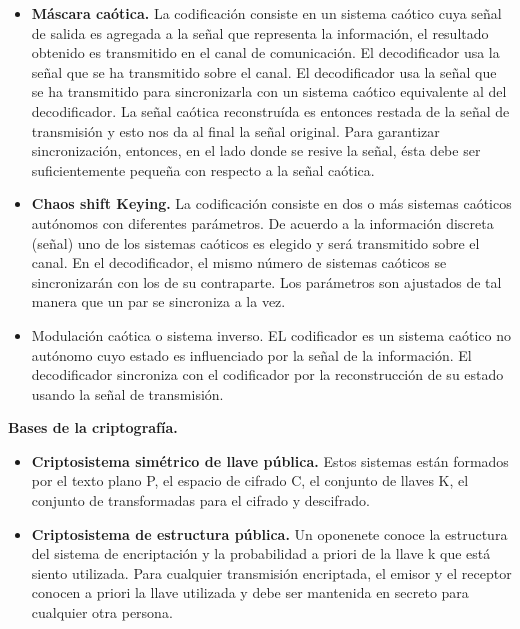 \documentclass[10pt]{IEEEtran}
\begin{document}
\begin{itemize}
\item \textbf{Máscara caótica.} La codificación consiste en un sistema caótico cuya señal de salida es agregada a la señal que representa la información, el resultado obtenido es transmitido en el canal de comunicación. El decodificador usa la señal que se ha transmitido sobre el canal. El decodificador usa la señal que se ha transmitido para sincronizarla con un sistema caótico equivalente al del decodificador. La señal caótica reconstruída es entonces restada de la señal de transmisión y esto nos da al final la señal original. Para garantizar sincronización, entonces, en el lado donde se resive la señal, ésta debe ser suficientemente pequeña con respecto a la señal caótica. 

\item \textbf{Chaos shift Keying.} La codificación consiste en dos o más sistemas caóticos autónomos con diferentes parámetros. De acuerdo a la información discreta (señal) uno de los sistemas caóticos es elegido y será transmitido sobre el canal. En el decodificador, el mismo número de sistemas caóticos se sincronizarán con los de su contraparte. Los parámetros son ajustados de tal manera que un par se sincroniza a la vez.
\item Modulación caótica o sistema inverso. EL codificador es un sistema caótico no autónomo cuyo estado es influenciado por la señal de la información. El decodificador sincroniza con el codificador por la reconstrucción de su estado usando la señal de transmisión.
\end{itemize}


\textbf{Bases de la criptografía.}\\
\begin{itemize}
\item \textbf{Criptosistema simétrico de llave pública.} Estos sistemas están formados por el texto plano P, el espacio de cifrado C, el conjunto de llaves K, el conjunto de transformadas para el cifrado y descifrado.

\item \textbf{Criptosistema de estructura pública.} Un oponenete conoce la estructura del sistema de encriptación y la probabilidad a priori de la llave k que está siento utilizada. Para cualquier transmisión encriptada, el emisor y el receptor conocen a priori la llave utilizada y debe ser mantenida en secreto para cualquier otra persona.
\end{itemize}
\end{document}
